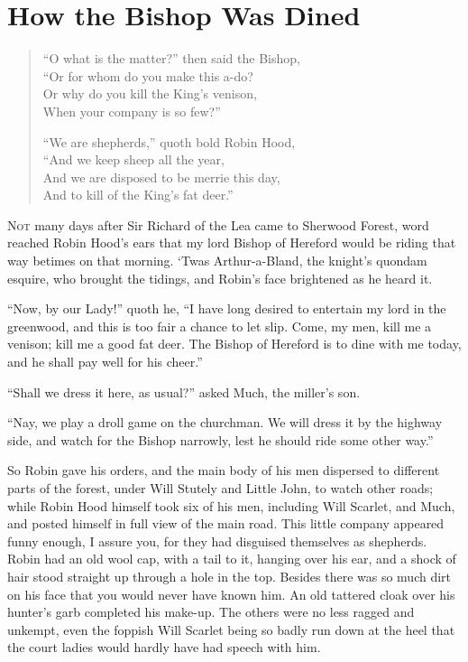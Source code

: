\chapter{How the Bishop Was Dined}

\begin{quote}
“O what is the matter?” then said the Bishop,\\
“Or for whom do you make this a-do?\\
Or why do you kill the King’s venison,\\
When your company is so few?”

“We are shepherds,” quoth bold Robin Hood,\\
“And we keep sheep all the year,\\
And we are disposed to be merrie this day,\\
And to kill of the King’s fat deer.”
\end{quote}

\lettrine{N}{ot} many days after Sir Richard of the Lea came to Sherwood Forest, word
reached Robin Hood's ears that my lord Bishop of Hereford would be
riding that way betimes on that morning. `Twas Arthur-a-Bland, the
knight's quondam esquire, who brought the tidings, and Robin's face
brightened as he heard it.

``Now, by our Lady!'' quoth he, ``I have long desired to entertain my
lord in the greenwood, and this is too fair a chance to let slip. Come,
my men, kill me a venison; kill me a good fat deer. The Bishop of
Hereford is to dine with me today, and he shall pay well for his
cheer.''

``Shall we dress it here, as usual?'' asked Much, the miller's son.

``Nay, we play a droll game on the churchman. We will dress it by the
highway side, and watch for the Bishop narrowly, lest he should ride
some other way.''

So Robin gave his orders, and the main body of his men dispersed to
different parts of the forest, under Will Stutely and Little John, to
watch other roads; while Robin Hood himself took six of his men,
including Will Scarlet, and Much, and posted himself in full view of the
main road. This little company appeared funny enough, I assure you, for
they had disguised themselves as shepherds. Robin had an old wool cap,
with a tail to it, hanging over his ear, and a shock of hair stood
straight up through a hole in the top. Besides there was so much dirt on
his face that you would never have known him. An old tattered cloak over
his hunter's garb completed his make-up. The others were no less ragged
and unkempt, even the foppish Will Scarlet being so badly run down at
the heel that the court ladies would hardly have had speech with him.

